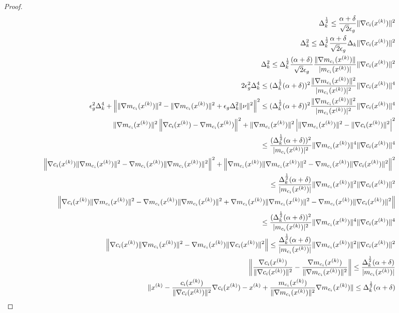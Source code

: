 \begin{proof}
\begin{align*}
\Delta_k^{\frac 1 2} \le \frac{\alpha+\delta}{\sqrt{2}\epsilon_{g}}\|\nabla c_i({x^{(k)}})\|^2\\
\Delta_k^{2} \le \Delta_k^{\frac 1 2}\frac{\alpha+\delta}{\sqrt{2}\epsilon_{g}}\Delta_k\|\nabla c_i({x^{(k)}})\|^2 \\
\Delta_k^{2} \le\Delta_k^{\frac 1 2} \frac{(\alpha + \delta)}{\sqrt{2}\epsilon_{g}}\frac{\|\nabla m_{c_i}({x^{(k)}})\|}{|m_{c_i}({x^{(k)}})|}\|\nabla c_i({x^{(k)}})\|^2\\
2\epsilon_{g}^2\Delta_k^4
\le (\Delta_k^{\frac 1 2}(\alpha + \delta))^2\frac{\|\nabla m_{c_i}({x^{(k)}})\|^2}{|m_{c_i}({x^{(k)}})|^2}\|\nabla c_i({x^{(k)}})\|^4\\
\epsilon_{g}^2\Delta_k^4
+\left\|\|\nabla m_{c_i}({x^{(k)}})\|^2 - \|\nabla m_{c_i}({x^{(k)}})\|^2 + \epsilon_{g}\Delta_k^2\|\nu \|^2 \right\|^2
\le (\Delta_k^{\frac 1 2}(\alpha + \delta))^2\frac{\|\nabla m_{c_i}({x^{(k)}})\|^2}{|m_{c_i}({x^{(k)}})|^2}\|\nabla c_i({x^{(k)}})\|^4\\
\|\nabla m_{c_i}({x^{(k)}})\|^2\left\|\nabla c_i({x^{(k)}}) - \nabla m_{c_i}({x^{(k)}})\right\|^2
+\|\nabla m_{c_i}({x^{(k)}})\|^2\left|\|\nabla m_{c_i}({x^{(k)}})\|^2 - \|\nabla c_i({x^{(k)}})\|^2
\right|^2\\
\le \frac{(\Delta_k^{\frac 1 2}(\alpha + \delta))^2}{|m_{c_i}({x^{(k)}})|^2}\|\nabla m_{c_i}({x^{(k)}})\|^4\|\nabla c_i({x^{(k)}})\|^4\\
\left\|\nabla c_i({x^{(k)}})\|\nabla m_{c_i}({x^{(k)}})\|^2 - \nabla m_{c_i}({x^{(k)}})\|\nabla m_{c_i}({x^{(k)}})\|^2\right\|^2
+\left\|\nabla m_{c_i}({x^{(k)}})\|\nabla m_{c_i}({x^{(k)}})\|^2 - \nabla m_{c_i}({x^{(k)}})\|\nabla c_i({x^{(k)}})\|^2
\right\|^2\\
\le \frac{\Delta_k^{\frac 1 2}(\alpha + \delta)}{|m_{c_i}({x^{(k)}})|}\|\nabla m_{c_i}({x^{(k)}})\|^2\|\nabla c_i({x^{(k)}})\|^2\\
\left\|\nabla c_i({x^{(k)}})\|\nabla m_{c_i}({x^{(k)}})\|^2 - \nabla m_{c_i}({x^{(k)}})\|\nabla m_{c_i}({x^{(k)}})\|^2
+\nabla m_{c_i}({x^{(k)}})\|\nabla m_{c_i}({x^{(k)}})\|^2 - \nabla m_{c_i}({x^{(k)}})\|\nabla c_i({x^{(k)}})\|^2
\right\|\\
\le  \frac{(\Delta_k^{\frac 1 2}(\alpha + \delta))^2}{|m_{c_i}({x^{(k)}})|^2}\|\nabla m_{c_i}({x^{(k)}})\|^4\|\nabla c_i({x^{(k)}})\|^4\\
\left\|\nabla c_i({x^{(k)}})\|\nabla m_{c_i}({x^{(k)}})\|^2 -
\nabla m_{c_i}({x^{(k)}})\|\nabla c_i({x^{(k)}})\|^2
\right\| \le \frac{\Delta_k^{\frac 1 2}(\alpha + \delta)}{|m_{c_i}({x^{(k)}})|}\|\nabla m_{c_i}({x^{(k)}})\|^2\|\nabla c_i({x^{(k)}})\|^2\\
\left\|\frac{\nabla c_i({x^{(k)}})}{\|\nabla c_i({x^{(k)}})\|^2} -
\frac{\nabla m_{c_i}({x^{(k)}})}{\|\nabla m_{c_i}({x^{(k)}})\|^2}
\right\| \le \frac{\Delta_k^{\frac 1 2}(\alpha + \delta)}{|m_{c_i}({x^{(k)}})|}\\
\|
{x^{(k)}} - \frac{c_i({x^{(k)}})}{\|\nabla c_i({x^{(k)}})\|^2}\nabla c_i({x^{(k)}}) -
{x^{(k)}} + \frac{m_{c_i}({x^{(k)}})}{\|\nabla m_{c_i}({x^{(k)}})\|^2}\nabla m_{c_i}({x^{(k)}})
\| \le \Delta_k^{\frac 1 2}(\alpha + \delta)\\
\end{align*}

\end{proof}


